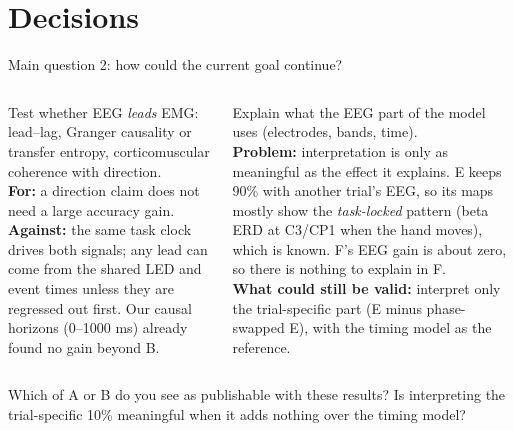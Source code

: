 \documentclass[aspectratio=169,10pt]{beamer}
\newcommand{\Verify}[1]{\begin{tcolorbox}[askbox,title={Check with the supervisor}]#1\end{tcolorbox}}
\begin{document}
\section{Decisions}

\begin{frame}{Main question 2: how could the current goal continue?}
  \begin{columns}[T]
    \begin{tcolorbox}[stagebox,title={Option A: causal direction}]
      \scriptsize
      Test whether EEG \emph{leads} EMG: lead--lag, Granger causality or transfer entropy, corticomuscular coherence
      with direction.\\[2pt]
      \textbf{For:} a direction claim does not need a large accuracy gain.\\
      \textbf{Against:} the same task clock drives both signals; any lead can come from the shared LED and event
      times unless they are regressed out first. Our causal horizons (0--1000 ms) already found no gain beyond B.
    \end{tcolorbox}
    \begin{tcolorbox}[stagebox,title={Option B: interpretability}]
      \scriptsize
      Explain what the EEG part of the model uses (electrodes, bands, time).\\[2pt]
      \textbf{Problem:} interpretation is only as meaningful as the effect it explains. E keeps 90\% with another
      trial's EEG, so its maps mostly show the \emph{task-locked} pattern (beta ERD at C3/CP1 when the hand moves),
      which is known. F's EEG gain is about zero, so there is nothing to explain in F.\\[2pt]
      \textbf{What could still be valid:} interpret only the trial-specific part (E minus phase-swapped E), with the
      timing model as the reference.
    \end{tcolorbox}
  \end{columns}
  \Verify{\scriptsize Which of A or B do you see as publishable with these results? Is interpreting the trial-specific 10\% meaningful when it adds nothing over the timing model?}
\end{frame}
\end{document}
